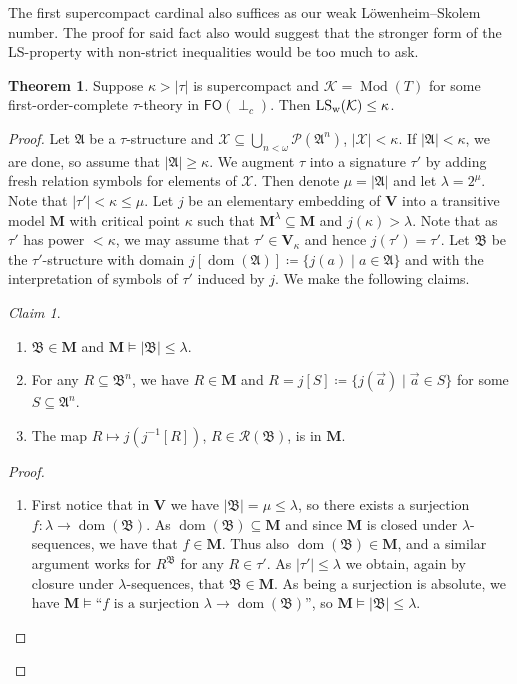 \documentclass[a4paper]{amsart}
\theoremstyle{definition}
\newtheorem{theorem}[definition]{Theorem}
\theoremstyle{remark}
\newtheorem*{claim}{Claim}
\newcommand{\A}{\mathcal{A}}
\newcommand{\B}{\mathcal{B}}
\DeclareMathOperator{\Pow}{\wp}
\DeclareMathOperator{\dom}{dom}
\newcommand\foil{\mathsf{FO}(\perp_c)}
\newcommand{\K}{\mathcal{K}}
\newcommand{\R}{\mathcal{R}}
\newcommand{\X}{\mathcal{X}}
\newcommand{\V}{\mathbf{V}}
\theoremstyle{definition}
\renewcommand{\A}{\mathfrak{A}}
\renewcommand{\B}{\mathfrak{B}}
\newcommand{\bM}{\mathbf{M}}
\DeclareMathOperator{\Mod}{Mod}
\renewcommand{\Pow}{\mathcal{P}}
\begin{document}
The first supercompact cardinal also suffices as our weak Löwenheim--Skolem number. The proof for said fact
also would suggest that the stronger form of the LS-property with non-strict inequalities would be too much to ask.


\begin{theorem}\label{Lowenheim--Skolem-theorem}
    Suppose $\kappa>|\tau|$ is supercompact and $\K = \Mod(T)$ for some first-order-complete $\tau$-theory in $\foil$. Then $\WLS(\K)\leq\kappa$.
\end{theorem}
\begin{proof}
    Let $\A$ be a $\tau$-structure and $\X\subseteq\bigcup_{n<\omega}\Pow(\A^n)$, $|\X|<\kappa$. If $|\A|<\kappa$, we are done, so assume that $|\A|\geq\kappa$. We augment $\tau$ into a signature $\tau'$ by adding fresh relation symbols for elements of $\X$. Then denote $\mu = |\A|$ and let $\lambda = 2^{\mu}$. Note that $|\tau'|<\kappa\leq\mu$. Let $j$ be an elementary embedding of $\V$ into a transitive model $\bM$ with critical point $\kappa$ such that $\bM^\lambda\subseteq\bM$ and $j(\kappa)>\lambda$. Note that as $\tau'$ has power $<\kappa$, we may assume that $\tau'\in\V_\kappa$ and hence $j(\tau') = \tau'$. Let $\B$ be the $\tau'$-structure with domain $j[\dom(\A)]\coloneqq\{j(a) \mid a\in\A\}$ and with the interpretation of symbols of $\tau'$ induced by $j$.
    We make the following claims.

    \begin{claim}\quad
        \begin{enumerate}
            \item $\B\in\bM$ and $\bM\models|\B|\leq\lambda$.
            \item For any $R\subseteq\B^n$, we have $R\in\bM$ and $R=j[S] \coloneqq \{j(\vec a) \mid \vec a \in S\}$ for some $S\subseteq\A^n$.
            \item The map $R\mapsto j(j^{-1}[R])$, $R\in\R(\B)$, is in $\bM$.
        \end{enumerate}
    \end{claim}
    \begin{proof}
        \begin{enumerate}
            \item First notice that in $\V$ we have $|\B|=\mu\leq\lambda$, so there exists a surjection $f\colon\lambda\to\dom(\B)$. As $\dom(\B)\subseteq \bM$  and since $\bM$ is closed under $\lambda$-sequences, we have  that $f\in\bM$. Thus also $\dom(\B)\in\bM$, and a similar argument works for $R^\B$ for any $R\in\tau'$. As $|\tau'|\leq\lambda$ we obtain, again by closure under $\lambda$-sequences, that $\B\in\bM$. As being a surjection is absolute, we have $\bM\models\text{``$f$ is a surjection $\lambda\to\dom(\B)$''}$, so $\bM\models|\B|\leq\lambda$.
            

\end{enumerate}
\end{proof}
\end{proof}
\end{document}
